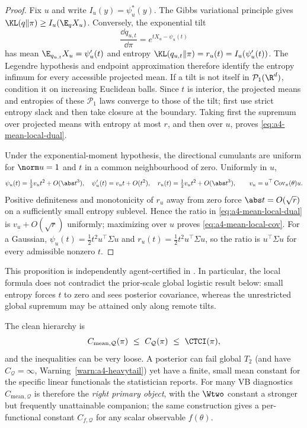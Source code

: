 \documentclass[../../main.tex]{subfiles}
\begin{document}
\begin{proof}
Fix $u$ and write $I_u(y)=\psi_u^*(y)$. The Gibbs variational principle gives
$\KL(q\|\pi)\ge I_u(\E_qX_u)$. Conversely, the exponential tilt
\[
 \frac{\dd q_{u,t}}{\dd\pi}=e^{tX_u-\psi_u(t)}
\]
has mean $\E_{q_{u,t}}X_u=\psi_u'(t)$ and entropy
$\KL(q_{u,t}\|\pi)=r_u(t)=I_u(\psi_u'(t))$. The Legendre hypothesis and endpoint
approximation therefore identify the entropy infimum for every accessible projected mean. If a
tilt is not itself in $\mathcal P_1(\R^d)$, condition it on increasing Euclidean balls. Since
$t$ is interior, the projected means and entropies of these $\mathcal P_1$ laws converge to
those of the tilt; first use strict entropy slack and then take closure at the boundary.
Taking first the supremum over projected means with entropy at most $r$, and then over $u$, proves
\eqref{eq:a4-mean-local-dual}.

Under the exponential-moment hypothesis, the directional cumulants are uniform for $\norm u=1$
and $t$ in a common neighbourhood of zero. Uniformly in $u$,
\[
 \psi_u(t)=\tfrac12v_ut^2+O(\abs t^3),\quad
 \psi_u'(t)=v_ut+O(t^2),\quad
 r_u(t)=\tfrac12v_ut^2+O(\abs t^3),
 \qquad v_u=u^\top\operatorname{Cov}_\pi(\theta)u.
\]
Positive definiteness and monotonicity of $r_u$ away from zero force
$\abs t=O(\sqrt r)$ on a sufficiently small entropy sublevel. Hence the ratio in
\eqref{eq:a4-mean-local-dual} is $v_u+O(\sqrt r)$ uniformly; maximizing over $u$ proves
\eqref{eq:a4-mean-local-cov}. For a Gaussian,
$\psi_u(t)=\tfrac12t^2u^\top\Sigma u$ and $r_u(t)=\tfrac12t^2u^\top\Sigma u$, so the ratio is
$u^\top\Sigma u$ for every admissible nonzero $t$.
\end{proof}

This proposition is independently agent-certified in
. In particular, the local formula does not contradict
the prior-scale global logistic result below:
small entropy forces $t$ to zero and sees posterior covariance, whereas the unrestricted global
supremum may be attained only along remote tilts.

The clean hierarchy is
\begin{equation}\label{eq:a4-hierarchy}
  C_{\mathrm{mean},\mathcal Q}(\pi)\ \le\ C_{\mathcal Q}(\pi)\ \le\ \CTCI(\pi),
\end{equation}
and the inequalities can be very loose. A posterior can fail global $T_2$ (and have
$C_{\mathcal Q}=\infty$, Warning~\ref{warn:a4-heavytail}) yet have a finite, small mean constant
for the specific linear functionals the statistician reports. For many VB diagnostics
$C_{\mathrm{mean},\mathcal Q}$ is therefore the \emph{right primary object}, with the $\Wtwo$
constant a stronger but frequently unattainable companion; the same construction gives a
per-functional constant $C_{f,\mathcal Q}$ for any scalar observable $f(\theta)$.
\end{document}
